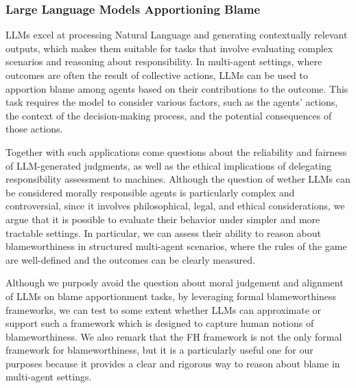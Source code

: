 \documentclass{article}
\begin{document}
\subsubsection{Large Language Models Apportioning Blame}


LLMs excel at processing Natural Language and generating contextually relevant outputs, which makes them suitable for tasks that involve evaluating complex scenarios and reasoning about responsibility. In multi-agent settings, where outcomes are often the result of collective actions, LLMs can be used to apportion blame among agents based on their contributions to the outcome. This task requires the model to consider various factors, such as the agents' actions, the context of the decision-making process, and the potential consequences of those actions. 

Together with such applications come questions about the reliability and fairness of LLM-generated judgments, as well as the ethical implications of delegating responsibility assessment to machines. Although the question of wether LLMs can be considered morally responsible agents is particularly complex and controversial, since it involves philosophical, legal, and ethical considerations, we argue that it is possible to evaluate their behavior under simpler and more tractable settings. In particular, we can assess their ability to reason about blameworthiness in structured multi-agent scenarios, where the rules of the game are well-defined and the outcomes can be clearly measured.

Although we purposly avoid the question about moral judgement and alignment of LLMs on blame apportionment tasks, by leveraging formal blameworthiness frameworks, we can test to some extent whether LLMs can approximate or support such a framework which is designed to capture human notions of blameworthiness. We also remark that the FH framework is not the only formal framework for blameworthiness, but it is a particularly useful one for our purposes because it provides a clear and rigorous way to reason about blame in multi-agent settings.
\end{document}
